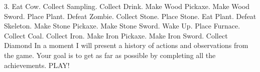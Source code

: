 {3. Eat Cow. Collect Sampling. Collect Drink. Make Wood Pickaxe. Make Wood Sword. Place Plant. Defeat Zombie. Collect Stone. Place Stone. Eat Plant. Defeat Skeleton. Make Stone Pickaxe. Make Stone Sword. Wake Up. Place Furnace. Collect Coal. Collect Iron. Make Iron Pickaxe. Make Iron Sword. Collect Diamond\newline
\newline
In a moment I will present a history of actions and observations from the game.
Your goal is to get as far as possible by completing all the achievements.
\newline
PLAY!
}



